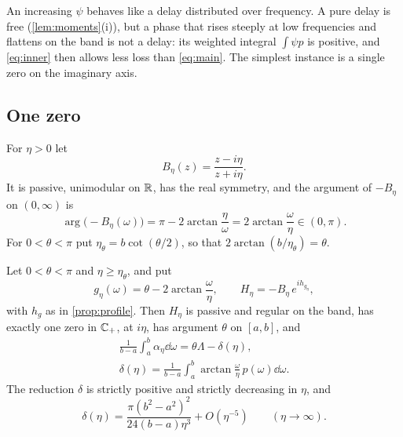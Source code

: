 An increasing $\psi$ behaves like a delay distributed over frequency. A pure
delay is free (\cref{lem:moments}(i)), but a phase that rises steeply at low
frequencies and flattens on the band is not a delay: its weighted integral
$\int\psi p$ is positive, and \eqref{eq:inner} then allows less loss than
\eqref{eq:main}. The simplest instance is a single zero on the imaginary
axis.

\subsection{One zero}

For $\eta>0$ let
\[
B_\eta(z)=\frac{z-i\eta}{z+i\eta}.
\]
It is passive, unimodular on $\mathbb R$, has the real symmetry, and the argument
of $-B_\eta$ on $(0,\infty)$ is
\begin{equation}\label{eq:Bphase}
\arg\big(-B_\eta(\omega)\big)=\pi-2\arctan\frac\eta\omega=2\arctan\frac\omega\eta
\in(0,\pi).
\end{equation}
For $0<\theta<\pi$ put $\eta_\theta=b\cot(\theta/2)$, so that
$2\arctan(b/\eta_\theta)=\theta$.

\begin{proposition}\label{prop:onezero}
Let $0<\theta<\pi$ and $\eta\ge\eta_\theta$, and put
\[
g_\eta(\omega)=\theta-2\arctan\frac\omega\eta,\qquad
H_\eta=-B_\eta\,e^{ih_{g_\eta}},
\]
with $h_g$ as in \cref{prop:profile}. Then $H_\eta$ is passive and regular on
the band, has exactly one zero in $\mathbb C_{+}$, at $i\eta$, has argument $\theta$
on $[a,b]$, and
\begin{equation}\label{eq:onezero}
\begin{gathered}
\frac1{b-a}\int_a^b\alpha_\eta\dd\omega=\theta\Lambda-\delta(\eta),\\
\delta(\eta)=\frac1{b-a}\int_a^b\arctan\frac\omega\eta\,p(\omega)\dd\omega .
\end{gathered}
\end{equation}
The reduction $\delta$ is strictly positive and strictly decreasing in $\eta$,
and
\begin{equation}\label{eq:delta-asym}
\delta(\eta)=\frac{\pi(b^2-a^2)^2}{24(b-a)\eta^3}+O(\eta^{-5})\qquad(\eta\to\infty).
\end{equation}
\end{proposition}


